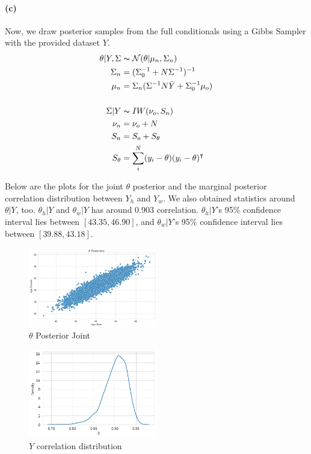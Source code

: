 \documentclass[11pt, letterpaper]{article}
\begin{document}
\paragraph{(c)}
Now, we draw posterior samples from the full conditionals using a Gibbs Sampler with the provided dataset $Y$.
\begin{align*}
    \theta|Y, \Sigma &\thicksim \mathcal{N}(\theta|\mu_n, \Sigma_n) \\
    \Sigma_n &= (\Sigma_0^{-1} + N \Sigma^{-1})^{-1} \\
    \mu_n &= \Sigma_n (\Sigma^{-1}N\bar{Y} + \Sigma_0^{-1}\mu_o) \\ \\
    \Sigma|Y &\thicksim IW(\nu_o, S_n) \\
    \nu_n &= \nu_o + N \\
    S_n &= S_o + S_\theta \\
    S_\theta &= \sum_i^N (y_i - \theta)(y_i - \theta)^{\intercal}
\end{align*}

Below are the plots for the joint $\theta$ posterior and the marginal posterior correlation distribution between $Y_h$ and $Y_w$.
We also obtained statistics around $\theta|Y$, too. $\theta_h|Y$ and $\theta_w|Y$ has around 0.903 correlation. $\theta_h|Y$'s
95\% confidence interval lies between $[43.35, 46.90]$, and $\theta_w|Y$'s 95\% confidence interval lies between $[39.88, 43.18]$.
\begin{figure}[!h]
  \centering
  \includegraphics[width=0.5\textwidth]{1.b.png}
  \captionsetup{justification=centering}
  \caption{$\theta$ Posterior Joint}
\end{figure}
\begin{figure}[!h]
  \centering
  \includegraphics[width=0.5\textwidth]{1.c.png}
  \captionsetup{justification=centering}
  \caption{$Y$ correlation distribution}
\end{figure}
\end{document}
